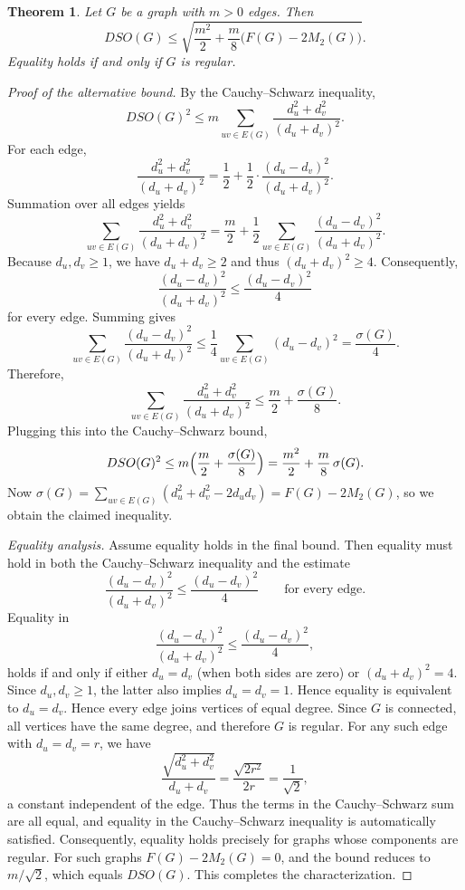 \documentclass{article}
\newtheorem{theorem}{Theorem}
\theoremstyle{definition}
\begin{document}
\begin{theorem}\label{alt}
Let $G$ be a  graph with $m>0$ edges. Then
\[
DSO(G) \le \sqrt{\frac{m^{2}}{2}+\frac{m}{8}\bigl(F(G)-2M_{2}(G)\bigr)}.
\]
Equality holds if and only if $G$ is regular.
\end{theorem}
\begin{proof}[Proof of the alternative bound]
By the Cauchy--Schwarz inequality,
\[
DSO(G)^{2} \le m\sum_{uv\in E(G)} \frac{d_u^{2}+d_v^{2}}{(d_u+d_v)^{2}}.
\]
For each edge,
\[
\frac{d_u^{2}+d_v^{2}}{(d_u+d_v)^{2}}
= \frac12+\frac12\cdot\frac{(d_u-d_v)^{2}}{(d_u+d_v)^{2}}.
\]
Summation over all edges yields
\[
\sum_{uv\in E(G)}\frac{d_u^{2}+d_v^{2}}{(d_u+d_v)^{2}}
= \frac{m}{2}+\frac12\sum_{uv\in E(G)}\frac{(d_u-d_v)^{2}}{(d_u+d_v)^{2}}.
\]
Because $d_u,d_v\ge 1$, we have $d_u+d_v\ge 2$ and thus $(d_u+d_v)^{2}\ge 4$.
Consequently,
\[
\frac{(d_u-d_v)^{2}}{(d_u+d_v)^{2}} \le \frac{(d_u-d_v)^{2}}{4}
\]
for every edge. Summing gives
\[
\sum_{uv\in E(G)}\frac{(d_u-d_v)^{2}}{(d_u+d_v)^{2}}
\le \frac14\sum_{uv\in E(G)}(d_u-d_v)^{2}
= \frac{\sigma(G)}{4}.
\]
Therefore,
\[
\sum_{uv\in E(G)}\frac{d_u^{2}+d_v^{2}}{(d_u+d_v)^{2}}
\le \frac{m}{2}+\frac{\sigma(G)}{8}.
\]
Plugging this into the Cauchy--Schwarz bound,
\[
DSO(G)^{2} \le m\Bigl(\frac{m}{2}+\frac{\sigma(G)}{8}\Bigr)
= \frac{m^{2}}{2}+\frac{m}{8}\,\sigma(G).
\]
Now $\sigma(G)=\sum_{uv\in E(G)}(d_u^{2}+d_v^{2}-2d_ud_v)=F(G)-2M_{2}(G)$, so we obtain the claimed inequality.

\medskip
\noindent\textit{Equality analysis.}
Assume equality holds in the final bound.
Then equality must hold in both the Cauchy--Schwarz inequality and the estimate
\[
\frac{(d_u-d_v)^{2}}{(d_u+d_v)^{2}} \le \frac{(d_u-d_v)^{2}}{4} \qquad\text{for every edge}.
\]
Equality in
\[
\frac{(d_u-d_v)^2}{(d_u+d_v)^2}
\le
\frac{(d_u-d_v)^2}{4},
\]
holds if and only if either $d_u=d_v$ (when both sides are zero) or
$(d_u+d_v)^2=4$.
Since $d_u,d_v\ge1$, the latter also implies $d_u=d_v=1$.
Hence equality is equivalent to $d_u=d_v$.
Hence every edge joins vertices of equal degree. Since $G$ is connected,
all vertices have the same degree, and therefore $G$ is regular. For any such edge with $d_u=d_v=r$, we have
\[
\frac{\sqrt{d_u^{2}+d_v^{2}}}{d_u+d_v} = \frac{\sqrt{2r^{2}}}{2r} = \frac{1}{\sqrt{2}},
\]
a constant independent of the edge. Thus the terms in the Cauchy--Schwarz sum are all equal, and equality in the Cauchy--Schwarz inequality is automatically satisfied.
Consequently, equality holds precisely for graphs whose components are regular.
For such graphs $F(G)-2M_{2}(G)=0$, and the bound reduces to $m/\sqrt{2}$, which equals $DSO(G)$.
This completes the characterization.
\end{proof}
\end{document}

